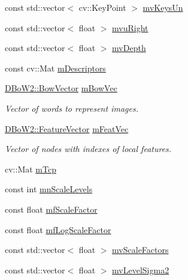 \begin{DoxyCompactItemize}
const std\+::vector$<$ cv\+::\+Key\+Point $>$ \mbox{\hyperlink{class_o_r_b___s_l_a_m2_1_1_key_frame_aaf6c65fc098f41ff418a65934f514ce3}{mv\+Keys\+Un}}
\item 
const std\+::vector$<$ float $>$ \mbox{\hyperlink{class_o_r_b___s_l_a_m2_1_1_key_frame_a3e11913b55821be56c9f447ab6437dd5}{mvu\+Right}}
\item 
const std\+::vector$<$ float $>$ \mbox{\hyperlink{class_o_r_b___s_l_a_m2_1_1_key_frame_a01da66d3e5e482b239ec22d2487a6085}{mv\+Depth}}
\item 
const cv\+::\+Mat \mbox{\hyperlink{class_o_r_b___s_l_a_m2_1_1_key_frame_ae08ac0ce59e2c003c182f946de3b3bc0}{m\+Descriptors}}
\item 
\mbox{\hyperlink{class_d_bo_w2_1_1_bow_vector}{D\+Bo\+W2\+::\+Bow\+Vector}} \mbox{\hyperlink{class_o_r_b___s_l_a_m2_1_1_key_frame_a70cb0dee48e804c5b1f30afd0ce99787}{m\+Bow\+Vec}}
\begin{DoxyCompactList}\small\item\em Vector of words to represent images. \end{DoxyCompactList}\item 
\mbox{\hyperlink{class_d_bo_w2_1_1_feature_vector}{D\+Bo\+W2\+::\+Feature\+Vector}} \mbox{\hyperlink{class_o_r_b___s_l_a_m2_1_1_key_frame_a3588bf0a927e8ab838c614565ee7de20}{m\+Feat\+Vec}}
\begin{DoxyCompactList}\small\item\em Vector of nodes with indexes of local features. \end{DoxyCompactList}\item 
cv\+::\+Mat \mbox{\hyperlink{class_o_r_b___s_l_a_m2_1_1_key_frame_aab9c8e2e4aa4757ad0be28b2f49a3cf7}{m\+Tcp}}
\item 
const int \mbox{\hyperlink{class_o_r_b___s_l_a_m2_1_1_key_frame_abd3b2544330774672483656955e0ca03}{mn\+Scale\+Levels}}
\item 
const float \mbox{\hyperlink{class_o_r_b___s_l_a_m2_1_1_key_frame_a18fbd1aa1da7c7cd68cb05d8e5b78a08}{mf\+Scale\+Factor}}
\item 
const float \mbox{\hyperlink{class_o_r_b___s_l_a_m2_1_1_key_frame_ae7ca053915d4aaba66c1fd5962182d14}{mf\+Log\+Scale\+Factor}}
\item 
const std\+::vector$<$ float $>$ \mbox{\hyperlink{class_o_r_b___s_l_a_m2_1_1_key_frame_a8cdc02a7bccd3b75e61351a1f14f9c04}{mv\+Scale\+Factors}}
\item 
const std\+::vector$<$ float $>$ \mbox{\hyperlink{class_o_r_b___s_l_a_m2_1_1_key_frame_aa4a9029bf7ea62953ac38644756fcd3b}{mv\+Level\+Sigma2}}

\end{DoxyCompactItemize}
